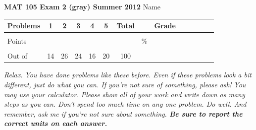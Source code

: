 \documentclass[12pt]{article}
\begin{document}
\textbf{MAT 105 Exam 2 (gray) Summer 2012} \hspace{.4in} {\large Name} \hrulefill

\begin{center}

\begin{tabular}
{|l|c|c|c|c|c|c|c|c|c|c|c|c|c|} \hline

 Problems & \hspace{5 pt} 1 \hspace{5 pt}  & \hspace{5 pt} 2 \hspace{5 pt} & \hspace{5 pt} 3  \hspace{5 pt} & \hspace{5 pt} 4  \hspace{5 pt} & \hspace{5 pt}5 \hspace{5 pt} & \hspace{5 pt} Total  \hspace{5 pt} & &  \hspace{5 pt} Grade \hspace{5 pt}  \\ \hline
&&&&&&&&\\  
Points &&&&&&&    \hspace{.8in}\% &  \\ 
&&&&&&&& \\  \hline
Out of & 14 & 26 & 24  & 16 & 20 &100 & & \\ \hline

\end {tabular}

\end{center}

\vspace{.2in}

 \emph{Relax.  You have done problems like these before.  Even if these problems look a bit different, just do what you can.  If you're not sure of something, please ask! You may use your calculator.  Please show all of your work and write down as many steps as you can.  Don't spend too much time on any one problem.  Do well.  And remember, ask me if you're not sure about something. \textbf{Be sure to report the correct units on each answer.}}

\hrulefill
\end{document}
